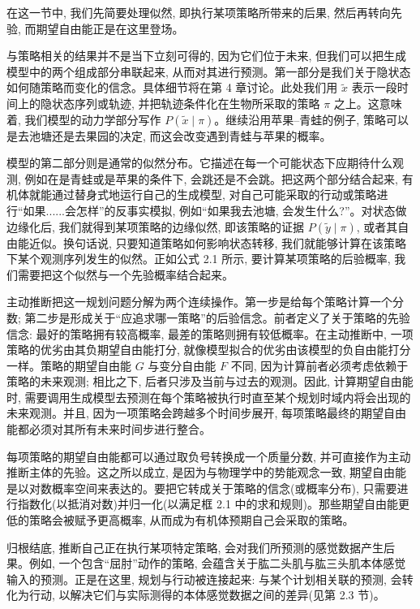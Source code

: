 在这一节中, 我们先简要处理似然, 即执行某项策略所带来的后果, 然后再转向先验, 而期望自由能正是在这里登场。

与策略相关的结果并不是当下立刻可得的, 因为它们位于未来, 但我们可以把生成模型中的两个组成部分串联起来, 从而对其进行预测。第一部分是我们关于隐状态如何随策略而变化的信念。具体细节将在第 4 章讨论。此处我们用 $\tilde{x}$ 表示一段时间上的隐状态序列或轨迹, 并把轨迹条件化在生物所采取的策略 $\pi$ 之上。这意味着, 我们模型的动力学部分写作 $P(\tilde{x} \mid \pi)$。继续沿用苹果--青蛙的例子, 策略可以是去池塘还是去果园的决定, 而这会改变遇到青蛙与苹果的概率。

模型的第二部分则是通常的似然分布。它描述在每一个可能状态下应期待什么观测, 例如在是青蛙或是苹果的条件下, 会跳还是不会跳。把这两个部分结合起来, 有机体就能通过替身式地运行自己的生成模型, 对自己可能采取的行动或策略进行``如果......会怎样''的反事实模拟, 例如``如果我去池塘, 会发生什么?''。对状态做边缘化后, 我们就得到某项策略的边缘似然, 即该策略的证据 $P(\tilde{y} \mid \pi)$, 或者其自由能近似。换句话说, 只要知道策略如何影响状态转移, 我们就能够计算在该策略下某个观测序列发生的似然。正如公式 2.1 所示, 要计算某项策略的后验概率, 我们需要把这个似然与一个先验概率结合起来。

主动推断把这一规划问题分解为两个连续操作。第一步是给每个策略计算一个分数; 第二步是形成关于``应追求哪一策略''的后验信念。前者定义了关于策略的先验信念: 最好的策略拥有较高概率, 最差的策略则拥有较低概率。在主动推断中, 一项策略的优劣由其负期望自由能打分, 就像模型拟合的优劣由该模型的负自由能打分一样。策略的期望自由能 $G$ 与变分自由能 $F$ 不同, 因为计算前者必须考虑依赖于策略的未来观测; 相比之下, 后者只涉及当前与过去的观测。因此, 计算期望自由能时, 需要调用生成模型去预测在每个策略被执行时直至某个规划时域内将会出现的未来观测。并且, 因为一项策略会跨越多个时间步展开, 每项策略最终的期望自由能都必须对其所有未来时间步进行整合。

每项策略的期望自由能都可以通过取负号转换成一个质量分数, 并可直接作为主动推断主体的先验。这之所以成立, 是因为与物理学中的势能观念一致, 期望自由能是以对数概率空间来表达的。要把它转成关于策略的信念(或概率分布), 只需要进行指数化(以抵消对数)并归一化(以满足框 2.1 中的求和规则)。那些期望自由能更低的策略会被赋予更高概率, 从而成为有机体预期自己会采取的策略。

归根结底, 推断自己正在执行某项特定策略, 会对我们所预测的感觉数据产生后果。例如, 一个包含``屈肘''动作的策略, 会蕴含关于肱二头肌与肱三头肌本体感觉输入的预测。正是在这里, 规划与行动被连接起来: 与某个计划相关联的预测, 会转化为行动, 以解决它们与实际测得的本体感觉数据之间的差异(见第 2.3 节)。

